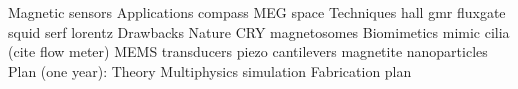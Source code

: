 


%
Magnetic sensors
Applications
        compass
        MEG
        space
Techniques
        hall
        gmr
        fluxgate
        squid
        serf
        lorentz
Drawbacks
Nature
        CRY
        magnetosomes
Biomimetics
        mimic cilia (cite flow meter)
MEMS transducers
     piezo cantilevers
     magnetite nanoparticles
Plan (one year):
     Theory
     Multiphysics simulation
     Fabrication plan

